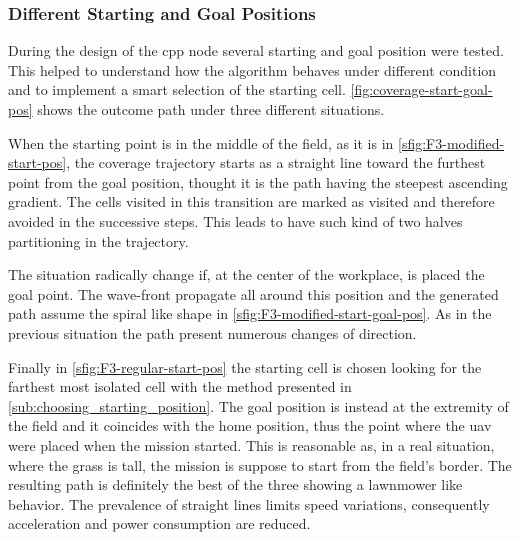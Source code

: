 \subsubsection{Different Starting and Goal Positions} %
\label{ssub:different_starting_and_goal_positions}
During the design of {}the \acrshort{cpp} node several starting and goal position were tested. This helped to understand how the algorithm behaves under different condition and to implement a smart selection of the starting cell. \autoref{fig:coverage-start-goal-pos} shows the outcome path under three different situations.\par
When the starting point is in the middle of the field, as it is in \autoref{sfig:F3-modified-start-pos}, the coverage trajectory starts as a straight line toward the furthest point from the goal position, thought it is the path having the steepest ascending gradient. The cells visited in this transition are marked as visited and therefore avoided in the successive steps. This leads to have such kind of two halves partitioning in the trajectory.\par
The situation radically change if, at the center of the workplace, is placed the goal point. The wave-front propagate all around this position and the generated path assume the spiral like shape in \autoref{sfig:F3-modified-start-goal-pos}. As in the previous situation the path present numerous changes of direction.\par
Finally in \autoref{sfig:F3-regular-start-pos} the starting cell is chosen looking for the farthest most isolated cell with the method presented in \autoref{sub:choosing_starting_position}. The goal position is instead at the extremity of the field and it coincides with the home position, thus the point where the \acrshort{uav} were placed when the mission started. This is reasonable as, in a real situation, where the grass is tall, the mission is suppose to start from the field's border. The resulting path is definitely the best of the three showing a lawnmower like behavior. The prevalence of straight lines limits speed variations, consequently acceleration and power consumption are reduced.
